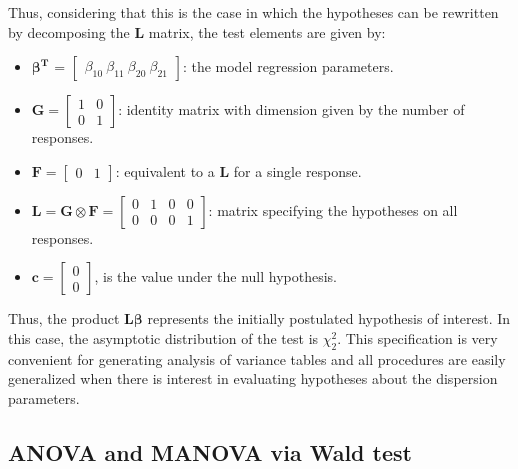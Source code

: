 \documentclass[article]{jss}\usepackage[]{graphicx}\usepackage[]{xcolor}
\begin{document}
Thus, considering that this is the case in which the hypotheses can be rewritten by decomposing the $\boldsymbol{L}$ matrix, the test elements are given by:

\begin{itemize}
  
  \item $\boldsymbol{\beta^{T}}$ = $\begin{bmatrix} \beta_{10} \  \beta_{11} \  \beta_{20} \  \beta_{21} \end{bmatrix}$: the model regression parameters.


\item $\boldsymbol{G} = \begin{bmatrix} 1 & 0 \\ 0 & 1  \end{bmatrix}$: identity matrix with dimension given by the number of responses.

\item $\boldsymbol{F} = \begin{bmatrix} 0 & 1 \end{bmatrix}$: equivalent to a $\boldsymbol{L}$ for a single response.

\item $\boldsymbol{L} = \boldsymbol{G} \otimes \boldsymbol{F} =  \begin{bmatrix} 0 & 1 & 0 & 0 \\
0 & 0 & 0 & 1 \end{bmatrix}$: matrix specifying the hypotheses on all responses.
 
\item $\boldsymbol{c} = \begin{bmatrix} 0 \\ 0 \end{bmatrix}$, is the value under the null hypothesis. 

\end{itemize}

Thus, the product $\boldsymbol{L}\boldsymbol{\beta}$ represents the initially postulated hypothesis of interest. In this case, the asymptotic distribution of the test is $\chi^2_2$. This specification is very convenient for generating analysis of variance tables and all procedures are easily generalized when there is interest in evaluating hypotheses about the dispersion parameters.


\subsection{ANOVA and MANOVA via Wald test}
\end{document}
